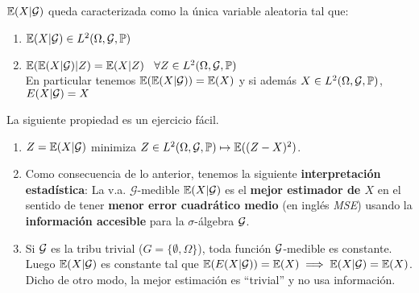 \begin{remark}
$\mathbb{E}(X|\mathcal{G})$ queda caracterizada como la única variable aleatoria tal que:
\begin{enumerate}
    \item $\mathbb{E}(X|\mathcal{G})\in L^2(\Omega,\mathcal{G},\mathbb{P})$
    \item $\mathbb{E}(\mathbb{E}(X|\mathcal{G})|Z) = \mathbb{E}(X|Z) \hspace{.25cm}\, \forall Z\in L^2(\Omega,\mathcal{G},\mathbb{P})$
    \vspace{.4cm}\\ En particular tenemos $\mathbb{E}(\mathbb{E}(X|\mathcal{G})) = \mathbb{E}(X)$ y si además $X\in L^2(\Omega,\mathcal{G},\mathbb{P})$, $E(X|\mathcal{G})=X$
\end{enumerate}
\end{remark}

La siguiente propiedad es un ejercicio fácil.
\begin{property}
\beforeitemize
\begin{enumerate}
    \item $Z=\mathbb{E}(X|\mathcal{G})$ minimiza $Z\in L^2(\Omega,\mathcal{G},\mathbb{P})\mapsto\mathbb{E}((Z-X)^2)$.
    \item Como consecuencia de lo anterior, tenemos la siguiente \textbf{interpretación estadística}: La v.a. $\mathcal{G}$-medible $\mathbb{E}(X|\mathcal{G})$ es el \textbf{mejor estimador de $X$} en el sentido de tener \textbf{menor error cuadrático medio} (en inglés \textit{MSE}) usando la \textbf{información accesible} para la $\sigma$-álgebra $\mathcal{G}$.
    \item Si $\mathcal{G}$ es la tribu trivial ($G=\{\emptyset,\Omega\}$), toda función $\mathcal{G}$-medible es constante. Luego $\mathbb{E}(X|\mathcal{G})$ es constante tal que $\mathbb{E}(E(X|\mathcal{G}))=\mathbb{E}(X)\implies\mathbb{E}(X|\mathcal{G})=\mathbb{E}(X)$. \\ Dicho de otro modo, la mejor estimación es ``trivial'' y no usa información.
\end{enumerate}
\end{property}

